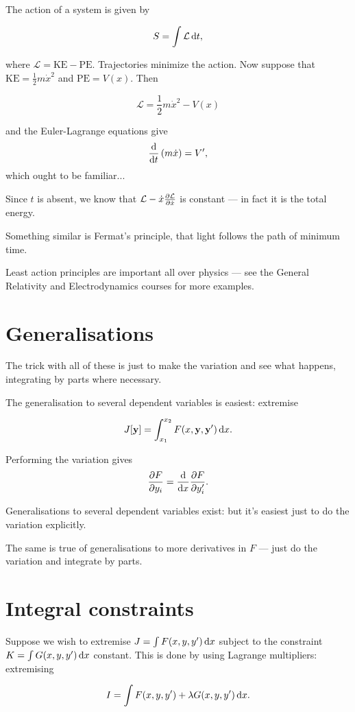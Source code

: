 \documentclass{notes}
\theoremstyle{plain}
\newcommand{\cL}{\mathcal{L}}
\begin{document}
The action of a system is given by

\[
S = \int \cL\, \ud t,
\]

where $\cL = \text{KE} - \text{PE}$.  Trajectories minimize the
action.  Now suppose that $\text{KE} = \frac{1}{2} m \Dot{x}^2$ and
$\text{PE} = V(x)$.   Then

\[
\cL = \frac{1}{2} m \Dot{x}^2 - V(x)
\]

and the Euler-Lagrange equations give
\[
\frac{\mathrm{d}}{\mathrm{d} t} \left( m \Dot{x} \right) = V',
\]
which ought to be familiar...

Since $t$ is absent, we know that $\cL - \Dot{x}\pd{\cL}{\Dot{x}}$ is
constant --- in fact it is the total energy.

Something similar is Fermat's principle, that light follows the path
of minimum time.

Least action principles are important all over physics --- see the
General Relativity and Electrodynamics courses for more examples.

\section{Generalisations}

The trick with all of these is just to make the variation and see what
happens, integrating by parts where necessary.

The generalisation to several dependent variables is easiest: extremise

\[
J[\mathbf{y}] = \int_{x_1}^{x_2} F(x,\mathbf{y}, \mathbf{y}')\, \mathrm{d} x.
\]

Performing the variation gives
\[
\frac{\partial F}{\partial y_i} = \frac{\mathrm{d}}{\mathrm{d} x} \frac{\partial F}{\partial y_i'}.
\]

Generalisations to several dependent variables exist: but it's easiest
just to do the variation explicitly.

The same is true of generalisations to more derivatives in $F$ ---
just do the variation and integrate by parts.

\section{Integral constraints}

Suppose we wish to extremise $J = \int F(x,y,y')\, \mathrm{d} x$ subject to
the constraint $K = \int G(x,y,y')\, \mathrm{d} x$ constant.  This is done by
using Lagrange multipliers: extremising

\[
I = \int F(x,y,y') + \lambda G(x,y,y')\, \mathrm{d} x.
\]
\end{document}

